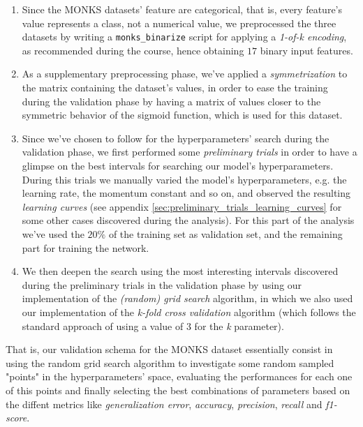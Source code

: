 \documentclass[11pt,twoside]{article}
\begin{document}
    \begin{enumerate}
        \item Since the MONKS datasets' feature are categorical, that is, every feature's value represents a
        class, not a numerical value, we preprocessed the three datasets by writing a \texttt{monks\_binarize}
        script for applying a \textit{1-of-k encoding}, as recommended during the course, hence obtaining
        $17$ binary input features.
        \item As a supplementary preprocessing phase, we've applied a \textit{symmetrization} to the matrix
        containing the dataset's values, in order to ease the training during the validation phase by having
        a matrix of values closer to the symmetric behavior of the sigmoid function, which is used for this
        dataset.
        \item Since we've chosen to follow \cite{random_search} for the hyperparameters' search during the
        validation phase, we first performed some \textit{preliminary trials} in order to have a glimpse on
        the best intervals for searching our model's hyperparameters. During this trials we manually varied
        the model's hyperparameters, e.g. the learning rate, the momentum constant and so on, and observed
        the resulting \textit{learning curves} (see appendix \ref{sec:preliminary_trials_learning_curves} for
        some other cases discovered during the analysis). For this part of the analysis we've used the
        $20\%$ of the training set as validation set, and the remaining part for training the network.
        \item We then deepen the search using the most interesting intervals discovered during the
        preliminary trials in the validation phase by using our implementation of the \textit{(random) grid
        search} algorithm, in which we also used our implementation of the \textit{k-fold cross validation}
        algorithm (which follows the standard approach of using a value of $3$ for the \textit{k} parameter).
    \end{enumerate}

    That is, our validation schema for the MONKS dataset essentially consist in using the random grid search
    algorithm to investigate some random sampled "points" in the hyperparameters' space, evaluating the
    performances for each one of this points and finally selecting the best combinations of parameters based
    on the diffent metrics like \textit{generalization error}, \textit{accuracy}, \textit{precision},
    \textit{recall} and \textit{f1-score}.
\end{document}
